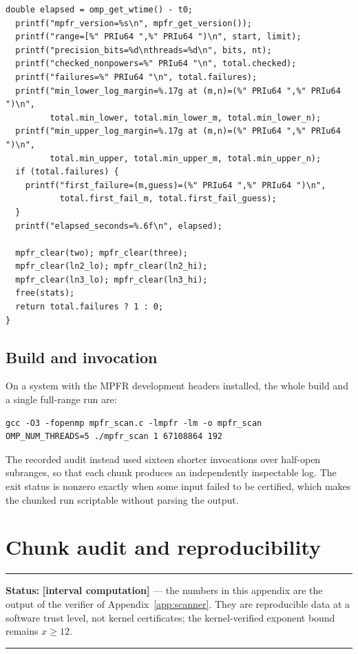 \documentclass[11pt,oneside]{article}
\theoremstyle{definition}
\theoremstyle{remark}
\newcommand{\statuscomp}{\textcolor{computeviolet}{\textbf{[interval computation]}}}
\newenvironment{statusbox}[1]
{\begin{center}\begin{minipage}{0.94\textwidth}\raggedright\hbadness=10000\hrule
\vspace{0.45em}\textbf{Status:} #1\par\vspace{0.35em}}
{\vspace{0.35em}\hrule\end{minipage}\end{center}}
\begin{document}
\begin{lstlisting}[style=pythonstyle,caption={Directed-rounding verifier (C99, MPFR, OpenMP).}]
  double elapsed = omp_get_wtime() - t0;
  printf("mpfr_version=%s\n", mpfr_get_version());
  printf("range=[%" PRIu64 ",%" PRIu64 ")\n", start, limit);
  printf("precision_bits=%d\nthreads=%d\n", bits, nt);
  printf("checked_nonpowers=%" PRIu64 "\n", total.checked);
  printf("failures=%" PRIu64 "\n", total.failures);
  printf("min_lower_log_margin=%.17g at (m,n)=(%" PRIu64 ",%" PRIu64 ")\n",
         total.min_lower, total.min_lower_m, total.min_lower_n);
  printf("min_upper_log_margin=%.17g at (m,n)=(%" PRIu64 ",%" PRIu64 ")\n",
         total.min_upper, total.min_upper_m, total.min_upper_n);
  if (total.failures) {
    printf("first_failure=(m,guess)=(%" PRIu64 ",%" PRIu64 ")\n",
           total.first_fail_m, total.first_fail_guess);
  }
  printf("elapsed_seconds=%.6f\n", elapsed);

  mpfr_clear(two); mpfr_clear(three);
  mpfr_clear(ln2_lo); mpfr_clear(ln2_hi);
  mpfr_clear(ln3_lo); mpfr_clear(ln3_hi);
  free(stats);
  return total.failures ? 1 : 0;
}
\end{lstlisting}

\subsection{Build and invocation}
\label{a3:verifier-build}

On a system with the MPFR development headers installed, the whole build and a single
full-range run are:

\begin{lstlisting}[style=pythonstyle,numbers=none,caption={Build and invocation (POSIX shell).}]
gcc -O3 -fopenmp mpfr_scan.c -lmpfr -lm -o mpfr_scan
OMP_NUM_THREADS=5 ./mpfr_scan 1 67108864 192
\end{lstlisting}

The recorded audit instead used sixteen shorter invocations over half-open subranges, so that
each chunk produces an independently inspectable log.  The exit status is nonzero exactly
when some input failed to be certified, which makes the chunked run scriptable without
parsing the output.

\section{Chunk audit and reproducibility}
\label{app:chunkaudit}

\begin{statusbox}{\statuscomp{} --- the numbers in this appendix are the output of the
verifier of Appendix~\ref{app:scanner}.  They are reproducible data at a software trust
level, not kernel certificates; the kernel-verified exponent bound remains $x\ge12$.}
\end{statusbox}
\end{document}
